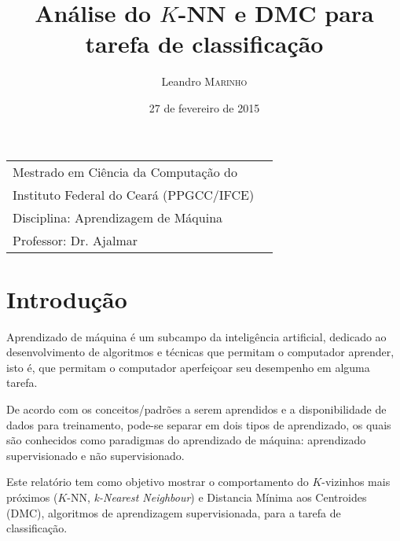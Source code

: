 \documentclass{article}
\title{Análise do $K$-NN e DMC para tarefa de classificação} %
\author{Leandro \textsc{Marinho}} %
\date{27 de fevereiro de 2015} %
\begin{document}
\maketitle %

\begin{center}
\begin{tabular}{l r}
Mestrado em Ciência da Computação do \\
Instituto Federal do Ceará (PPGCC/IFCE) \\
Disciplina: Aprendizagem de Máquina \\
Professor: Dr. Ajalmar %
\end{tabular}
\end{center}



\section{Introdução}

Aprendizado de máquina é um subcampo da inteligência artificial, dedicado ao desenvolvimento de algoritmos e técnicas que permitam o computador aprender, isto é, que permitam o computador aperfeiçoar seu desempenho em alguma tarefa.

De acordo com os conceitos/padrões a serem aprendidos e a disponibilidade de dados para treinamento, pode-se separar em dois tipos de aprendizado, os quais são conhecidos como paradigmas do aprendizado de máquina: aprendizado supervisionado e não supervisionado.

Este relatório tem como objetivo mostrar o comportamento do $K$-vizinhos mais próximos ($K$-NN, \textit{k-Nearest Neighbour}) e Distancia Mínima aos Centroides (DMC), algoritmos de aprendizagem supervisionada, para a tarefa de classificação.
 

%
\end{document}
